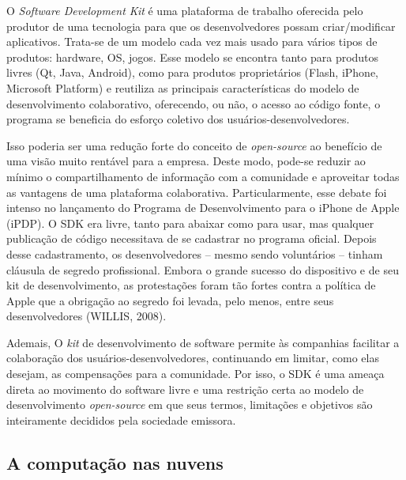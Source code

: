O \emph{Software Development Kit} é uma plataforma de trabalho oferecida pelo produtor de uma tecnologia para que os desenvolvedores possam criar/modificar aplicativos. Trata-se de um modelo cada vez mais usado para vários tipos de produtos: hardware, OS, jogos. Esse modelo se encontra tanto para produtos livres (Qt, Java, Android), como para produtos proprietários (Flash, iPhone, Microsoft Platform) e reutiliza as principais características do modelo de desenvolvimento colaborativo, oferecendo, ou não, o acesso ao código fonte, o programa se beneficia do esforço coletivo dos usuários-desenvolvedores.

Isso poderia ser uma redução forte do conceito de \emph{open-source} ao benefício de uma visão muito rentável para a empresa. Deste modo, pode-se reduzir ao mínimo o compartilhamento de informação com a comunidade e aproveitar todas as vantagens de uma plataforma colaborativa. Particularmente, esse debate foi intenso no lançamento do Programa de Desenvolvimento para o iPhone de Apple (iPDP). O SDK era livre, tanto para abaixar como para usar, mas qualquer publicação de código necessitava de se cadastrar no programa oficial. Depois desse cadastramento, os desenvolvedores – mesmo sendo voluntários – tinham cláusula de segredo profissional. Embora o grande sucesso do dispositivo e de seu kit de desenvolvimento, as protestações foram tão fortes contra a política de Apple que a obrigação ao segredo foi levada, pelo menos, entre seus desenvolvedores (WILLIS, 2008).

Ademais, O \emph{kit} de desenvolvimento de software permite às companhias facilitar a colaboração dos usuários-desenvolvedores, continuando em limitar, como elas desejam, as compensações para a comunidade. Por isso, o SDK é uma ameaça direta ao movimento do software livre e uma restrição certa ao modelo de desenvolvimento \emph{open-source} em que seus termos, limitações e objetivos são inteiramente decididos pela sociedade emissora.

\subsection{A computação nas nuvens} \label{1.4.2}

